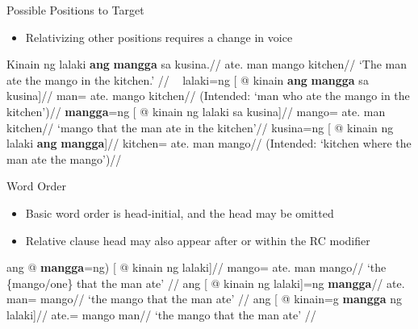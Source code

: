 \documentclass[pdf]{beamer}
\newcommand{\texthl}[1]{\textcolor{cyan!75!blue}{\textbf{#1}}}
\begin{document}
\begin{frame}{Possible Positions to Target}
  \begin{itemize}
    \item Relativizing other positions requires a change in voice
  \end{itemize}
  \ex\begingl
    \gla  Kinain ng lalaki \texthl{ang} \texthl{mangga} sa kusina.//
    \glb  ate.\Pv{} \Gen{} man \Nom{} mango \Obl{} kitchen//
    \glft `The man ate the mango in the kitchen.'
          //
  \endgl
  \xe\vspace{-1em}\pause
  \pex~
  \a{}\begingl
    \gla  lalaki=ng [ @ kinain \texthl{ang} \texthl{mangga} sa kusina]//
    \glb  man=\Lk{} ate.\Pv{} \Nom{} mango \Obl{} kitchen//
    \glft (Intended: `man who ate the mango in the kitchen')//
  \endgl
  \a\begingl
    \gla  \texthl{mangga}=ng [ @ kinain ng lalaki sa kusina]//
    \glb  mango=\Lk{} ate.\Pv{} \Gen{} man \Obl{} kitchen//
    \glft `mango that the man ate in the kitchen'//
  \endgl
  \a\ljudge{*}\begingl
    \gla  kusina=ng [ @ kinain ng lalaki \texthl{ang} \texthl{mangga}]//
    \glb  kitchen=\Lk{} ate.\Pv{} \Gen{} man \Nom{} mango//
    \glft (Intended: `kitchen where the man ate the mango')//
  \endgl
  \xe
\end{frame}

\begin{frame}{Word Order}
  \begin{itemize}
    \item Basic word order is head-initial, and the head may be omitted
    \item Relative clause head may also appear after or within the RC modifier \citep{aldridge2003,aldridge2017}
  \end{itemize}
  \pex
  \a\begingl
    \gla  ang \nogloss{(} @ \texthl{mangga}=ng) [ @ kinain ng lalaki]//
    \glb  \Nom{} mango=\Lk{} ate.\Pv{} \Gen{} man \Gen{} mango//
    \glft `the \{mango/one\} that the man ate'
          //
  \endgl
  \a\begingl
    \gla  ang [ @ kinain ng lalaki]=ng \texthl{mangga}//
    \glb  \Nom{} ate.\Pv{} \Gen{} man=\Lk{} mango//
    \glft `the mango that the man ate'
          //
  \endgl
  \a\begingl
    \gla  ang [ @ kinain=g \texthl{mangga} ng lalaki]//
    \glb  \Nom{} ate.\Pv=\Lk{} mango \Gen{} man//
    \glft `the mango that the man ate'
          //
  \endgl
  \xe
\end{frame}
\end{document}
